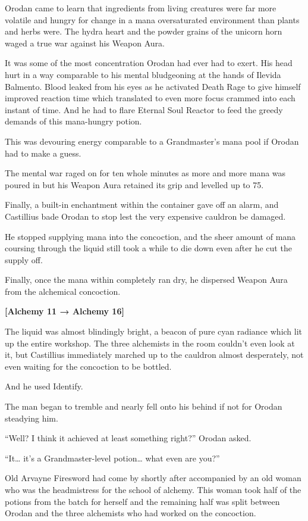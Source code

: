 \documentclass[a4paper,10pt]{book}
\begin{document}
Orodan came to learn that ingredients from living creatures were far more volatile and hungry for change in a mana oversaturated environment than plants and herbs were. The hydra heart and the powder grains of the unicorn horn waged a true war against his Weapon Aura.\par
It was some of the most concentration Orodan had ever had to exert. His head hurt in a way comparable to his mental bludgeoning at the hands of Ilevida Balmento. Blood leaked from his eyes as he activated Death Rage to give himself improved reaction time which translated to even more focus crammed into each instant of time. And he had to flare Eternal Soul Reactor to feed the greedy demands of this mana-hungry potion.\par
This was devouring energy comparable to a Grandmaster’s mana pool if Orodan had to make a guess.\par
The mental war raged on for ten whole minutes as more and more mana was poured in but his Weapon Aura retained its grip and levelled up to 75.\par
Finally, a built-in enchantment within the container gave off an alarm, and Castillius bade Orodan to stop lest the very expensive cauldron be damaged.\par
He stopped supplying mana into the concoction, and the sheer amount of mana coursing through the liquid still took a while to die down even after he cut the supply off.\par
Finally, once the mana within completely ran dry, he dispersed Weapon Aura from the alchemical concoction.\par
\textbf{[Alchemy 11 → Alchemy 16]}\par
The liquid was almost blindingly bright, a beacon of pure cyan radiance which lit up the entire workshop. The three alchemists in the room couldn’t even look at it, but Castillius immediately marched up to the cauldron almost desperately, not even waiting for the concoction to be bottled.\par
And he used Identify.\par
The man began to tremble and nearly fell onto his behind if not for Orodan steadying him.\par
“Well? I think it achieved at least something right?” Orodan asked.\par
“It… it’s a Grandmaster-level potion… what even are you?”\par
\par
Old Arvayne Firesword had come by shortly after accompanied by an old woman who was the headmistress for the school of alchemy. This woman took half of the potions from the batch for herself and the remaining half was split between Orodan and the three alchemists who had worked on the concoction.\par
\end{document}
